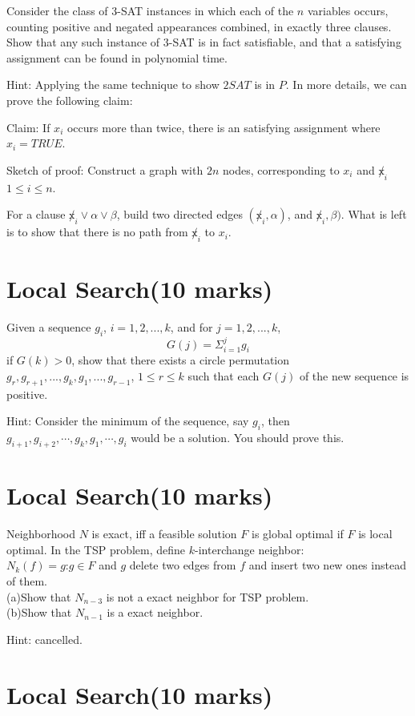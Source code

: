 \documentclass[a4paper,11pt]{article}
\begin{document}
Consider the class of 3-SAT instances in which each of the $n$ variables occurs, counting positive and negated appearances combined, in exactly three clauses. Show that any such instance of 3-SAT is in fact satisfiable, and that a satisfying assignment can be found in polynomial time.


Hint: Applying the same technique to show $2SAT$ is in $P$.  In more details, we can prove the following claim:

Claim: If $x_i$ occurs more than twice, there is an satisfying assignment where $x_i=TRUE$. 

Sketch of proof: Construct a graph with $2n$ nodes, corresponding to $x_i$ and $\not x_i$ $1\leq i \leq n$. 

For a clause $\not x_i \vee \alpha \vee \beta$, build two directed edges $(\not x_i, \alpha)$, and $ \not x_i, \beta )$. What is left is to show that there is no path from $\not x_i$ to $x_i$.
 
\section{Local Search(10 marks)}

Given a sequence $g_i$, $i=1,2,...,k$, and for $j=1,2,...,k$,
	  $$G(j)=\Sigma^j_{i=1} g_i$$
if $G(k)>0$, show that there exists a circle permutation $g_r,g_{r+1},...,g_k,g_1,...,g_{r-1}$, $1\leq r\leq k$ such that each $G(j)$ of the new sequence is positive.

Hint: Consider the minimum of the sequence, say $g_i$, then $g_{i+1}, g_{i+2}, \cdots, g_k, g_1, \cdots, g_i$ would be a solution. You should prove this.

\section{Local Search(10 marks)}

Neighborhood $N$ is exact, iff a feasible solution $F$ is global optimal if $F$ is local optimal. In the TSP problem, define $k$-interchange neighbor:\\
$N_k(f)=${$g$:$g\in F$ and $g$ delete two edges from $f$ and insert two new ones instead of them.}\\
	(a)Show that $N_{n-3}$ is not a exact neighbor for TSP problem.\\
	(b)Show that $N_{n-1}$ is a exact neighbor.

Hint: cancelled. 

\section{Local Search(10 marks)}
\end{document}
